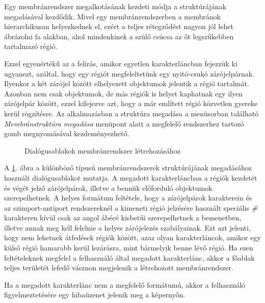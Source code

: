 Egy membránrendszer megalkotásának kezdeti módja a struktúrájának megadásával kezdődik. Mivel egy membránrendszerben a membránok hierarchikusan helyezkednek el, ezért a teljes rétegződést nagyon jól lehet ábrázolni fa alakban, ahol mindenkinek a szülő csúcsa az őt legszűkebben tartalmazó régió. 

Ezzel egyenértékű az a felírás, amikor egyetlen karakterláncban fejezzük ki ugyanezt, azáltal, hogy egy régiót megfeleltetünk egy nyitó-csukó zárójelpárnak. Ilyenkor a két zárójel között elhelyezett objektumok jelentik a régió tartalmát. Azonban nem csak objektumok, de más régiók is helyet kaphatnak egy ilyen zárójelpár között, ezzel kifejezve azt, hogy a már említett régió közvetlen gyereke kerül rögzítésre. 
Az alkalmazásban a struktúra megadása a menüsorban található \textit{Membránstruktúra megadása} menüpont alatt a megfelelő rendszerhez tartozó gomb megnyomásával kezdeményezhető.

\begin{figure}[H]
	\centering
	\vspace{5pt}
	\caption{Dialógusablakok membránrendszer létrehozásához}
	\label{fig:create_system}
\end{figure}

A \ref{fig:create_system}. ábra a különböző típusú membránrendszerek struktúrájának megadásához használt dialógusablakot mutatja. A megadott karakterláncban a régiók kezdetét és végét jelző zárójelpárok, illetve a bennük előforduló objektumok szerepelhetnek.
A helyes formátum feltétele, hogy a zárójelpárok karakterein és az szimport-antiport rendszereknél a kimeneti régió jelzésére használt speciális \textit{\#} karakteren kívül csak az angol ábécé kisbetűi szerepelhetnek a bemenetben, illetve annak meg kell felelnie a helyes zárójelezés szabályainak. Ezt azt jelenti, hogy nem lehetnek átfedések régiók között, azaz olyan karakterláncok, amikor egy külső régió hamarabb kerül lezárásra, mint bármelyik benne lévő régió. Ha ezen feltételeknek megfelel a felhasználó által megadott karakterlánc, akkor a főablak teljes területét lefedő vásznon megjelenik a létrehozott membránrendszer.

Ha a megadott karakterlánc nem a megfelelő formátumú, akkor a felhasználó figyelmeztetésére egy hibaüzenet jelenik meg a képernyőn. 

